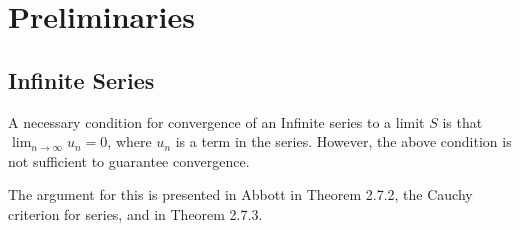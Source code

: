 \section{Preliminaries}

\subsection{Infinite Series}

A necessary condition for convergence of an Infinite series to a limit $S$ is that
$\lim_{n\rightarrow \infty} u_n = 0$, where $u_n$ is a term in the series.
However, the above condition is not sufficient to guarantee convergence.

The argument for this is presented in Abbott in Theorem 2.7.2, the Cauchy criterion for series,
and in Theorem 2.7.3.
\\~\\